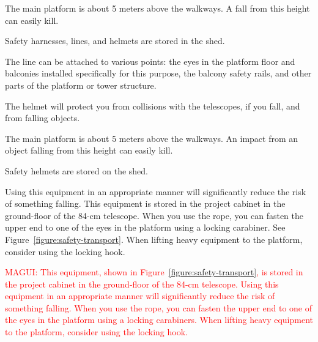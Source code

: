 
The main platform is about 5 meters above the walkways. A fall from this height can easily kill.

Safety harnesses, lines, and helmets are stored in the shed.

The line can be attached to various points: the eyes in the platform floor and balconies installed specifically for this purpose, the balcony safety rails, and other parts of the platform or tower structure.

The helmet will protect you from collisions with the telescopes, if you fall, and from falling objects.


The main platform is about 5 meters above the walkways. An impact from an object falling from this height can easily kill.

Safety helmets are stored on the shed.


Using this equipment in an appropriate manner will significantly reduce the risk of something falling. This equipment is stored in the project cabinet in the ground-floor of the 84-cm telescope. When you use the rope, you can fasten the upper end to one of the eyes in the platform using a locking carabiner. See Figure~\ref{figure:safety-transport}. When lifting heavy equipment to the platform, consider using the locking hook. 

\textcolor{red}{MAGUI: This equipment, shown in Figure~\ref{figure:safety-transport}, is stored in the project cabinet in the ground-floor of the 84-cm telescope. Using this equipment in an appropriate manner will significantly reduce the risk of something falling. When you use the rope, you can fasten the upper end to one of the eyes in the platform using a locking carabiners. When lifting heavy equipment to the platform, consider using the locking hook.}

